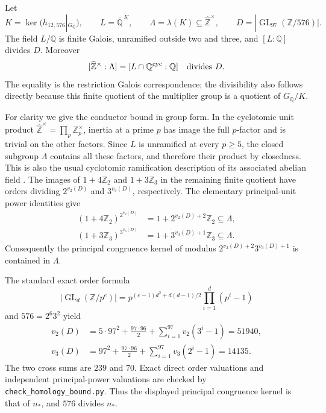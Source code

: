 Let
\[
 K=\ker(h_{12,576}|_{G_{\mathbb Q}}),\qquad
 L=\overline{\mathbb Q}^{\,K},\qquad
 \Lambda=\lambda(K)\subseteq\widehat{\mathbb Z}^{\times},
 \qquad D=|\operatorname{GL}_{97}(\mathbb Z/576)|.
\]
The field $L/\mathbb Q$ is finite Galois, unramified outside
two and three, and $[L:\mathbb Q]$ divides $D$.
Moreover
\[
 [\widehat{\mathbb Z}^{\times}:\Lambda]
       =[L\cap\mathbb Q^{\rm cyc}:\mathbb Q]
       \quad\hbox{divides }D.
\]
The equality is the restriction Galois correspondence; the
divisibility also follows directly because this finite
quotient of the multiplier group is a quotient of
$G_{\mathbb Q}/K$.

For clarity we give the conductor bound in group form.
In the cyclotomic unit product
$\widehat{\mathbb Z}^{\times}=\prod_p\mathbb Z_p^{\times}$,
inertia at a prime $p$ has image the full $p$-factor and
is trivial on the other factors. Since $L$ is unramified
at every $p\geq5$, the closed subgroup $\Lambda$ contains
all these factors, and therefore their product by closedness.
This is also the usual cyclotomic
ramification description of its associated abelian field
\cite[Chapter~I, Theorem~4.16 and its proof]{LiftMilneCFT2020}.
The images of $1+4\mathbb Z_2$ and $1+3\mathbb Z_3$ in
the remaining finite quotient have orders dividing
$2^{v_2(D)}$ and $3^{v_3(D)}$, respectively. The elementary
principal-unit power identities give
\[
 \begin{split}
 (1+4\mathbb Z_2)^{2^{v_2(D)}}
       &=1+2^{v_2(D)+2}\mathbb Z_2\subseteq\Lambda,\\
 (1+3\mathbb Z_3)^{3^{v_3(D)}}
       &=1+3^{v_3(D)+1}\mathbb Z_3\subseteq\Lambda.
 \end{split}
\]
Consequently the principal congruence kernel of modulus
$2^{v_2(D)+2}3^{v_3(D)+1}$ is contained in $\Lambda$.

The standard exact order formula
\[
 |\operatorname{GL}_d(\mathbb Z/p^e)|
   =p^{(e-1)d^2+d(d-1)/2}\prod_{i=1}^d(p^i-1)
\]
and $576=2^6 3^2$ yield
\[
 \begin{split}
 v_2(D)&=5\cdot97^2+\frac{97\cdot96}{2}
               +\sum_{i=1}^{97}v_2(3^i-1)=51940,\\
 v_3(D)&=97^2+\frac{97\cdot96}{2}
               +\sum_{i=1}^{97}v_3(2^i-1)=14135.
 \end{split}
\]
The two cross sums are $239$ and $70$. Exact direct order
valuations and independent principal-power valuations are
checked by \texttt{check\_homology\_bound.py}.
Thus the displayed principal congruence kernel is that of
$n_*$, and $576$ divides $n_*$.

